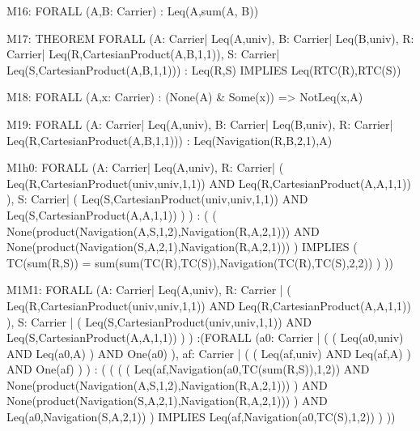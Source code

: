 \begin{verbnobox}[\tiny]
M16:
	FORALL (A,B: Carrier) : Leq(A,sum(A, B))
\end{verbnobox}

\begin{verbnobox}[\tiny]
M17:
	THEOREM FORALL (A: Carrier| Leq(A,univ), 
				    B: Carrier| Leq(B,univ), 
				    R: Carrier| Leq(R,CartesianProduct(A,B,1,1)), 
				    S: Carrier| Leq(S,CartesianProduct(A,B,1,1))) :  
		 	Leq(R,S) IMPLIES Leq(RTC(R),RTC(S))  
\end{verbnobox}

\begin{verbnobox}[\tiny]
M18:
	FORALL (A,x: Carrier) : (None(A) & Some(x)) => NotLeq(x,A)
\end{verbnobox}

\begin{verbnobox}[\tiny]
M19:
	FORALL (A: Carrier| Leq(A,univ), 
		    B: Carrier| Leq(B,univ), 
		    R: Carrier| Leq(R,CartesianProduct(A,B,1,1))) : Leq(Navigation(R,B,2,1),A)
\end{verbnobox}

\begin{verbnobox}[\tiny]
M1h0:
	FORALL (A: Carrier| Leq(A,univ), 
			R: Carrier| ( Leq(R,CartesianProduct(univ,univ,1,1)) AND Leq(R,CartesianProduct(A,A,1,1)) ), 
			S: Carrier| ( Leq(S,CartesianProduct(univ,univ,1,1)) AND Leq(S,CartesianProduct(A,A,1,1)) ) ) : 
	  (  ( None(product(Navigation(A,S,1,2),Navigation(R,A,2,1))) 
			AND None(product(Navigation(S,A,2,1),Navigation(R,A,2,1))) )  
      IMPLIES  
      	( TC(sum(R,S)) = sum(sum(TC(R),TC(S)),Navigation(TC(R),TC(S),2,2)) )  ))
\end{verbnobox}

\begin{verbnobox}[\tiny]
M1M1:
	FORALL (A: Carrier| Leq(A,univ), 
			R: Carrier | ( Leq(R,CartesianProduct(univ,univ,1,1)) AND Leq(R,CartesianProduct(A,A,1,1)) ),
			S: Carrier | ( Leq(S,CartesianProduct(univ,univ,1,1)) AND Leq(S,CartesianProduct(A,A,1,1)) ) )
	:(FORALL (a0: Carrier | ( ( Leq(a0,univ) AND Leq(a0,A) ) AND One(a0) ),
			  af: Carrier | ( ( Leq(af,univ) AND Leq(af,A) ) AND One(af) ) )
		: ( ( ( ( Leq(af,Navigation(a0,TC(sum(R,S)),1,2)) AND
				  None(product(Navigation(A,S,1,2),Navigation(R,A,2,1))) ) AND
				  None(product(Navigation(S,A,2,1),Navigation(R,A,2,1))) ) AND
				  Leq(a0,Navigation(S,A,2,1)) )
						IMPLIES Leq(af,Navigation(a0,TC(S),1,2)) ) ))
\end{verbnobox}

